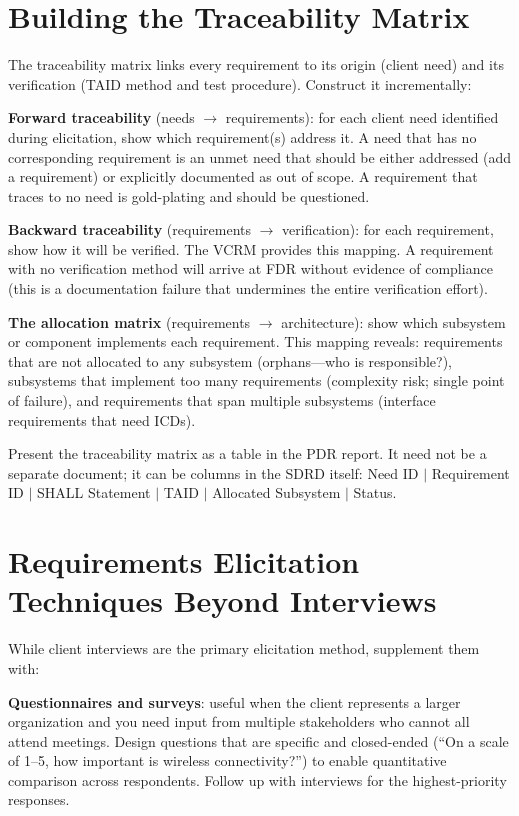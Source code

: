 \section{Building the Traceability Matrix}
The traceability matrix links every requirement to its origin (client need) and its verification (TAID method and test procedure). Construct it incrementally:

\textbf{Forward traceability} (needs $\to$ requirements): for each client need identified during elicitation, show which requirement(s) address it. A need that has no corresponding requirement is an unmet need that should be either addressed (add a requirement) or explicitly documented as out of scope. A requirement that traces to no need is gold-plating and should be questioned.

\textbf{Backward traceability} (requirements $\to$ verification): for each requirement, show how it will be verified. The VCRM provides this mapping. A requirement with no verification method will arrive at FDR without evidence of compliance (this is a documentation failure that undermines the entire verification effort).

\textbf{The allocation matrix} (requirements $\to$ architecture): show which subsystem or component implements each requirement. This mapping reveals: requirements that are not allocated to any subsystem (orphans---who is responsible?), subsystems that implement too many requirements (complexity risk; single point of failure), and requirements that span multiple subsystems (interface requirements that need ICDs).

Present the traceability matrix as a table in the PDR report. It need not be a separate document; it can be columns in the SDRD itself: Need ID $|$ Requirement ID $|$ SHALL Statement $|$ TAID $|$ Allocated Subsystem $|$ Status.



\section{Requirements Elicitation Techniques Beyond Interviews}
While client interviews are the primary elicitation method, supplement them with:

\textbf{Questionnaires and surveys}: useful when the client represents a larger organization and you need input from multiple stakeholders who cannot all attend meetings. Design questions that are specific and closed-ended (``On a scale of 1--5, how important is wireless connectivity?'') to enable quantitative comparison across respondents. Follow up with interviews for the highest-priority responses.


